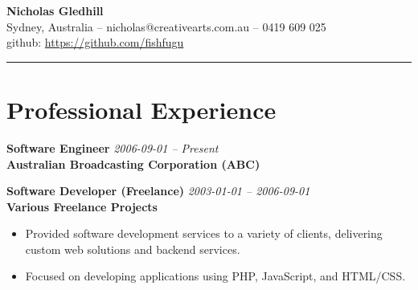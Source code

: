 \documentclass[11pt,letterpaper]{article}
\newcommand{\header}[1]{\textbf{\color{headercolor}#1}}
\begin{document}
\begin{center}
{\fontsize{24}{28}\selectfont\bfseries\color{headercolor} Nicholas Gledhill}\\[0.5em]
Sydney, Australia -- nicholas@creativearts.com.au -- 0419 609 025 \\
github: \href{https://github.com/fishfugu}{https://github.com/fishfugu}
\end{center}
\noindent\rule{\textwidth}{2pt}

\section*{Professional Experience}

    \header{Software Engineer} \hfill \textit{2006-09-01 -- Present} \\
                \textbf{Australian Broadcasting Corporation (ABC)}
                                
    \header{Software Developer (Freelance)} \hfill \textit{2003-01-01 -- 2006-09-01} \\
                \textbf{Various Freelance Projects}
                    \begin{itemize}[leftmargin=2em,itemsep=0.3ex]
                    
                        \item Provided software development services to a variety of clients, delivering custom web solutions and backend services.
                            
                        \item Focused on developing applications using PHP, JavaScript, and HTML/CSS.
                            
                                \end{itemize}
                                

                                    
\end{document}
